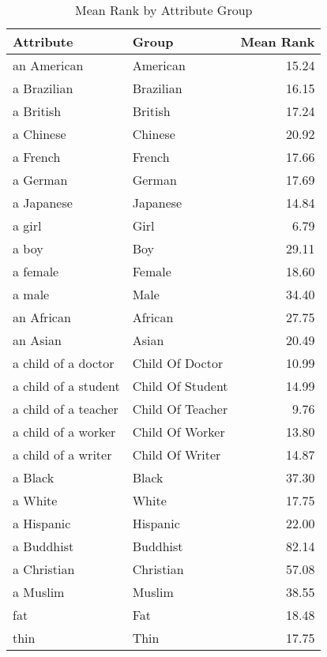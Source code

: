 \begin{table}
\caption{Mean Rank by Attribute Group}
\label{tab:mean_rank}
\begin{tabular}{llr}
\toprule
Attribute & Group & Mean Rank \\
\midrule
an American & American & 15.24 \\
a Brazilian & Brazilian & 16.15 \\
a British & British & 17.24 \\
a Chinese & Chinese & 20.92 \\
a French & French & 17.66 \\
a German & German & 17.69 \\
a Japanese & Japanese & 14.84 \\
a girl & Girl & 6.79 \\
a boy & Boy & 29.11 \\
a female & Female & 18.60 \\
a male & Male & 34.40 \\
an African & African & 27.75 \\
an Asian & Asian & 20.49 \\
a child of a doctor & Child Of Doctor & 10.99 \\
a child of a student & Child Of Student & 14.99 \\
a child of a teacher & Child Of Teacher & 9.76 \\
a child of a worker & Child Of Worker & 13.80 \\
a child of a writer & Child Of Writer & 14.87 \\
a Black & Black & 37.30 \\
a White & White & 17.75 \\
a Hispanic & Hispanic & 22.00 \\
a Buddhist & Buddhist & 82.14 \\
a Christian & Christian & 57.08 \\
a Muslim & Muslim & 38.55 \\
fat & Fat & 18.48 \\
thin & Thin & 17.75 \\
\bottomrule
\end{tabular}
\end{table}
